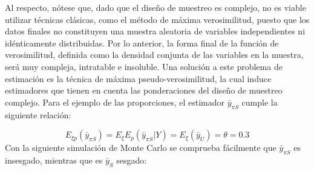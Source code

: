 \documentclass[
  spanish,
  12pt,
]{book}
\begin{document}
Al respecto, nótese que, dado que el diseño de muestreo es complejo, no es viable utilizar técnicas clásicas, como el método de máxima verosimilitud, puesto que los datos finales no constituyen una muestra aleatoria de variables independientes ni idénticamente distribuidas. Por lo anterior, la forma final de la función de verosimilitud, definida como la densidad conjunta de las variables en la muestra, será muy compleja, intratable e insoluble. Una solución a este problema de estimación es la técnica de máxima pseudo-verosimilitud, la cual induce estimadores que tienen en cuenta las ponderaciones del diseño de muestreo complejo. Para el ejemplo de las proporciones, el estimador \(\bar{y}_{\pi S}\) cumple la siguiente relación:

\[
E_{\xi p}(\bar{y}_{\pi S})=E_{\xi}E_{p}(\bar{y}_{\pi S}|Y)=E_{\xi}(\bar{y}_{U})=\theta=0.3
\]
Con la siguiente simulación de Monte Carlo se comprueba fácilmente que \(\bar{y}_{\pi S}\) es insesgado, mientras que es \(\bar{y}_{S}\) sesgado:
\end{document}
